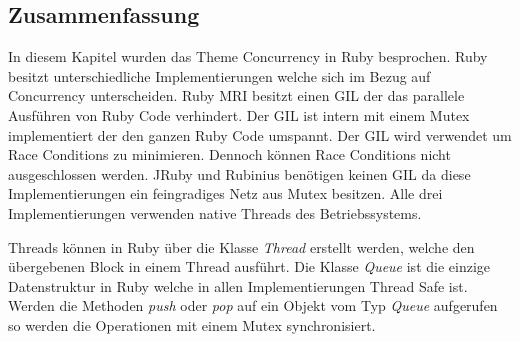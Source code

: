\subsection{Zusammenfassung}
In diesem Kapitel wurden das Theme Concurrency in Ruby besprochen. Ruby besitzt unterschiedliche Implementierungen welche sich im Bezug auf Concurrency unterscheiden. Ruby MRI besitzt einen GIL der das parallele Ausführen von Ruby Code verhindert. Der GIL ist intern mit einem Mutex implementiert der den ganzen Ruby Code umspannt. Der GIL wird verwendet um Race Conditions zu minimieren. Dennoch können Race Conditions nicht ausgeschlossen werden. JRuby und Rubinius benötigen keinen GIL da diese Implementierungen ein feingradiges Netz aus Mutex besitzen. Alle drei Implementierungen verwenden native Threads des Betriebssystems. 

Threads können in Ruby über die Klasse \emph{Thread} erstellt werden, welche den übergebenen Block in einem Thread ausführt. Die Klasse \emph{Queue} ist die einzige Datenstruktur in Ruby welche in allen Implementierungen Thread Safe ist. Werden die Methoden \emph{push} oder \emph{pop} auf ein Objekt vom Typ \emph{Queue} aufgerufen so werden die Operationen mit einem Mutex synchronisiert.